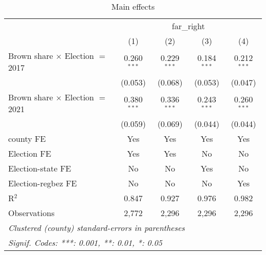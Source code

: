 \begin{table}[htbp]
   \caption{Main effects}
   \centering
   \begin{tabular}{lcccc}
      \tabularnewline \midrule \midrule
       & \multicolumn{4}{c}{far\_right}\\
                                              & (1)           & (2)           & (3)           & (4)\\  
      Brown share $\times$ Election $=$ 2017  & 0.260$^{***}$ & 0.229$^{***}$ & 0.184$^{***}$ & 0.212$^{***}$\\   
                                              & (0.053)       & (0.068)       & (0.053)       & (0.047)\\   
      Brown share $\times$ Election $=$ 2021  & 0.380$^{***}$ & 0.336$^{***}$ & 0.243$^{***}$ & 0.260$^{***}$\\   
                                              & (0.059)       & (0.069)       & (0.044)       & (0.044)\\   
      county FE                               & Yes           & Yes           & Yes           & Yes\\  
      Election FE                             & Yes           & Yes           & No            & No\\  
      Election-state FE                       & No            & No            & Yes           & No\\  
      Election-regbez FE                      & No            & No            & No            & Yes\\  
      R$^2$                                   & 0.847         & 0.927         & 0.976         & 0.982\\  
      Observations                            & 2,772         & 2,296         & 2,296         & 2,296\\  
      \midrule \midrule
      \multicolumn{5}{l}{\emph{Clustered (county) standard-errors in parentheses}}\\
      \multicolumn{5}{l}{\emph{Signif. Codes: ***: 0.001, **: 0.01, *: 0.05}}\\
   \end{tabular}
\end{table}



